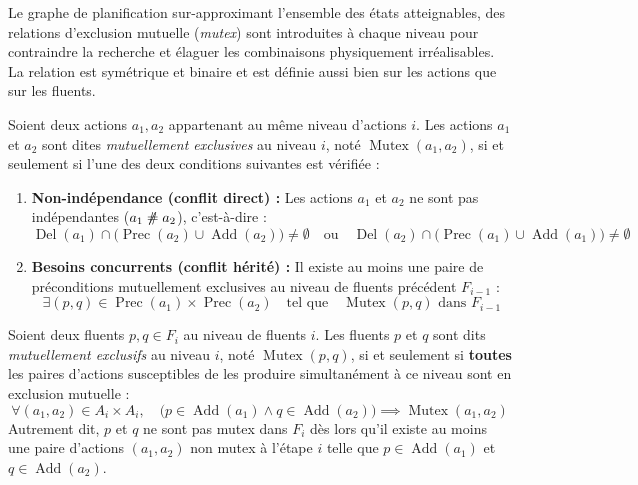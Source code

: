 Le graphe de planification sur-approximant l'ensemble des états atteignables, des relations d'exclusion mutuelle (\emph{mutex}) sont introduites à chaque niveau pour contraindre la recherche et élaguer les combinaisons physiquement irréalisables. La relation est symétrique et binaire et est définie aussi bien sur les actions que sur les fluents. 

\begin{definition}
    Soient deux actions $a_1, a_2$ appartenant au même niveau d'actions $i$. Les actions $a_1$ et $a_2$ sont dites \emph{mutuellement exclusives} au niveau $i$, noté $\operatorname{Mutex}(a_1, a_2)$, si et seulement si l'une des deux conditions suivantes est vérifiée :
    \begin{enumerate}
        \item \textbf{Non-indépendance (conflit direct) :} Les actions $a_1$ et $a_2$ ne sont pas indépendantes ($a_1 \not \mathrel{\#} a_2$), c'est-à-dire :
        \begin{equation}
            \operatorname{Del}(a_1) \cap \big(\operatorname{Prec}(a_2) \cup \operatorname{Add}(a_2)\big) \neq \emptyset \quad \text{ou}  \quad \operatorname{Del}(a_2) \cap \big(\operatorname{Prec}(a_1) \cup \operatorname{Add}(a_1)\big) \neq \emptyset
        \end{equation}
        \item \textbf{Besoins concurrents (conflit hérité) :} Il existe au moins une paire de préconditions mutuellement exclusives au niveau de fluents précédent $F_{i-1}$ :
        \begin{equation}
            \exists (p, q) \in \operatorname{Prec}(a_1) \times \operatorname{Prec}(a_2) \quad \text{tel que} \quad \operatorname{Mutex}(p, q) \text{ dans } F_{i-1}
        \end{equation}
    \end{enumerate}
\end{definition}

\begin{definition}
    Soient deux fluents $p, q \in F_i$ au niveau de fluents $i$. Les fluents $p$ et $q$ sont dits \emph{mutuellement exclusifs} au niveau $i$, noté $\operatorname{Mutex}(p, q)$, si et seulement si \textbf{toutes} les paires d'actions susceptibles de les produire simultanément à ce niveau sont en exclusion mutuelle :
    \begin{equation}
        \forall (a_1, a_2) \in A_i \times A_i, \quad \big(p \in \operatorname{Add}(a_1) \land q \in \operatorname{Add}(a_2)\big) \implies \operatorname{Mutex}(a_1, a_2)
    \end{equation}
    Autrement dit, $p$ et $q$ ne sont pas mutex dans $F_i$ dès lors qu'il existe au moins une paire d'actions $(a_1, a_2)$ non mutex à l'étape $i$ telle que $p \in \operatorname{Add}(a_1)$ et $q \in \operatorname{Add}(a_2)$.
\end{definition}

